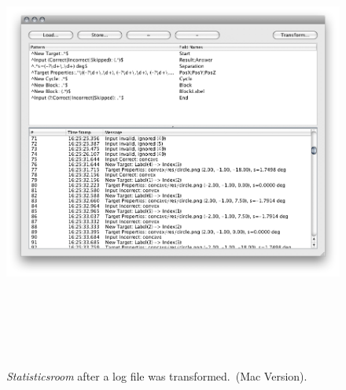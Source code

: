 \begin{figure}
\begin{center}
\includegraphics[height=15cm]{screenshots/sr_transform.png}
\caption{\textit{Statisticsroom} after a log file was transformed.\ER\ (Mac Version).\label{ssTransform}}
\end{center}
\end{figure}

\clearpage
